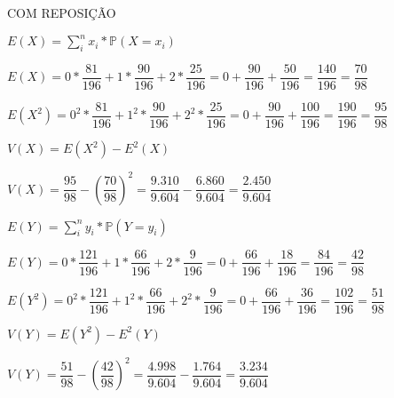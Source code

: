 \documentclass[12pt,a4paper]{article}
\begin{document}
\vspace{0.25cm}
COM REPOSIÇÃO
\begin{center}
	\vspace{0.25cm}
	$E(X) = \sum_{i}^{n} x_{i}*\mathbb{P}(X = x_{i})$
	
	\vspace{1cm}
	$E(X) = 0*\dfrac{81}{196}+1*\dfrac{90}{196}+2*\dfrac{25}{196}= 0 + \dfrac{90}{196} + \dfrac{50}{196} = \dfrac{140}{196} = \dfrac{70}{98}$
	
	\vspace{0.5cm}
	$E(X^{2}) = 0^{2}*\dfrac{81}{196}+1^{2}*\dfrac{90}{196}+2^{2}*\dfrac{25}{196} = 0 + \dfrac{90}{196} + \dfrac{100}{196} = \dfrac{190}{196} = \dfrac{95}{98}$
	
	\vspace{1cm}
	$V(X) = E(X^{2}) - E^{2}(X)$
	
	\vspace{1cm}
	$V(X) = \dfrac{95}{98}-(\dfrac{70}{98})^{2} = \dfrac{9.310}{9.604}-\dfrac{6.860}{9.604}=\dfrac{2.450}{9.604}$
	
	\vspace{1.5cm}
	$E(Y) = \sum_{i}^{n} y_{i}*\mathbb{P}(Y = y_{i})$
	
	\vspace{1cm}
	$E(Y) = 0*\dfrac{121}{196}+1*\dfrac{66}{196}+2*\dfrac{9}{196}= 0 + \dfrac{66}{196} + \dfrac{18}{196} = \dfrac{84}{196} = \dfrac{42}{98}$
	
	\vspace{0.5cm}
	$E(Y^{2}) = 0^{2}*\dfrac{121}{196}+1^{2}*\dfrac{66}{196}+2^{2}*\dfrac{9}{196} = 0 + \dfrac{66}{196} + \dfrac{36}{196} = \dfrac{102}{196} = \dfrac{51}{98}$
	
	\vspace{1cm}
	$V(Y) = E(Y^{2}) - E^{2}(Y)$
	
	\vspace{1cm}
	$V(Y) = \dfrac{51}{98}-(\dfrac{42}{98})^{2} = \dfrac{4.998}{9.604}-\dfrac{1.764}{9.604} = \dfrac{3.234}{9.604}$
\end{center}
\end{document}
